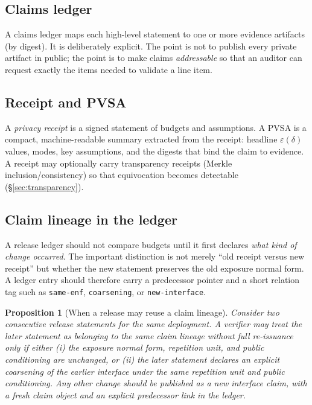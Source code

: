 \documentclass[11pt]{article}
\newtheorem{proposition}{Proposition}
\newcommand{\eps}{\varepsilon}
\begin{document}
\subsection{Claims ledger}
A claims ledger maps each high-level statement to one or more evidence artifacts (by digest).
It is deliberately explicit.
The point is not to publish every private artifact in public; the point is to make claims \emph{addressable} so that an auditor can request exactly the items needed to validate a line item.

\subsection{Receipt and PVSA}
A \emph{privacy receipt} is a signed statement of budgets and assumptions.
A PVSA is a compact, machine-readable summary extracted from the receipt: headline $\eps(\delta)$ values, modes, key assumptions, and the digests that bind the claim to evidence.
A receipt may optionally carry transparency receipts (Merkle inclusion/consistency) so that equivocation becomes detectable (\S\ref{sec:transparency}).

\subsection{Claim lineage in the ledger}
A release ledger should not compare budgets until it first declares \emph{what kind of change occurred}.
The important distinction is not merely ``old receipt versus new receipt'' but whether the new statement preserves the old exposure normal form.
A ledger entry should therefore carry a predecessor pointer and a short relation tag such as \texttt{same-enf}, \texttt{coarsening}, or \texttt{new-interface}.\cite{series:traceifaces,series:receiptitems,series:recert}

\begin{proposition}[When a release may reuse a claim lineage]
\label{prop:lineage}
Consider two consecutive release statements for the same deployment.
A verifier may treat the later statement as belonging to the same claim lineage without full re-issuance only if either
(i) the exposure normal form, repetition unit, and public conditioning are unchanged, or
(ii) the later statement declares an explicit coarsening of the earlier interface under the same repetition unit and public conditioning.
Any other change should be published as a new interface claim, with a fresh claim object and an explicit predecessor link in the ledger.
\end{proposition}
\end{document}
